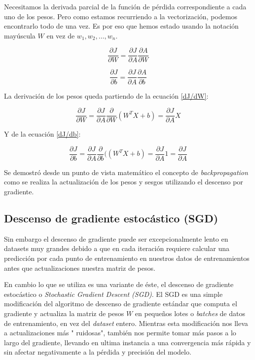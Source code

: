 \documentclass[a4paper,12pt]{article}
\begin{document}
Necesitamos la derivada parcial de la función de pérdida correspondiente a cada uno de los pesos. Pero como estamos recurriendo a la vectorización, podemos encontrarlo todo de una vez. Es por eso que hemos estado usando la notación mayúscula $W$ en vez de $w_1, w_2, \ldots, w_n$.

\begin{equation}
\frac{\partial J}{\partial W} = \frac{\partial J}{\partial A} \frac{\partial A}{\partial W}
\label{dJ/dW}
\end{equation}

\begin{equation}
\frac{\partial J}{\partial b} = \frac{\partial J}{\partial A} \frac{\partial A}{\partial b}
\label{dJ/db}
\end{equation}

La derivación de los pesos queda partiendo de la ecuación \ref{dJ/dW}:

\begin{equation}
\frac{\partial J}{\partial W} = \frac{\partial J}{\partial A} \frac{\partial}{\partial W}(W^T X + b) = \frac{\partial J}{\partial A} X
\end{equation}

Y de la ecuación \ref{dJ/db}:

\begin{equation}
\frac{\partial J}{\partial b} = \frac{\partial J}{\partial A} \frac{\partial}{\partial b}((W^T X + b) = \frac{\partial J}{\partial A} 1 = \frac{\partial J}{\partial A}
\end{equation}

Se demostró desde un punto de vista matemático el concepto de \textit{backpropagation} como se realiza la actualización de los pesos y sesgos utilizando el descenso por gradiente.

\subsection{Descenso de gradiente estocástico (SGD)}
Sin embargo el descenso de gradiente puede ser excepcionalmente lento en datasets muy grandes debido a que en cada iteración requiere calcular una predicción por cada punto de entrenamiento en nuestros datos de entrenamientos antes que actualizaciones nuestra matriz de pesos.

En cambio lo que se utiliza es una variante de éste, el descenso de gradiente estocástico o \textit{Stochastic Gradient Descent (SGD)}.
El SGD es una simple modificación del algoritmo de descenso de gradiente estándar que computa el gradiente y actualiza la matriz de pesos $W$ en pequeños lotes o \textit{batches} de datos de entrenamiento, en vez del \textit{dataset} entero. Mientras esta modificación nos lleva a actualizaciones más " ruidosas", también nos permite tomar más pasos a lo largo del gradiente, llevando en ultima instancia a una convergencia más rápida y sin afectar negativamente a la pérdida y precisión del modelo.
\end{document}
